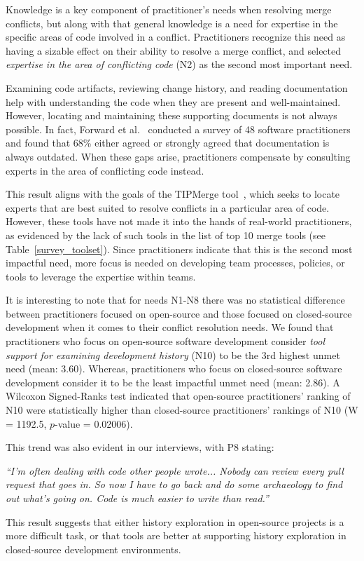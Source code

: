 Knowledge is a key component of practitioner's needs when resolving merge conflicts, but along with that general knowledge is a need for expertise in the specific areas of code involved in a conflict.
Practitioners recognize this need as having a sizable effect on their ability to resolve a merge conflict, and selected \textit{expertise in the area of conflicting code} (N2) as the second most important need.

Examining code artifacts, reviewing change history, and reading documentation help with understanding the code when they are present and well-maintained.
However, locating and maintaining these supporting documents is not always possible.
In fact, Forward et al.~\cite{forward2002documentation} conducted a survey of 48 software practitioners and found that 68\% either agreed or strongly agreed that documentation is always outdated.
When these gaps arise, practitioners compensate by consulting experts in the area of conflicting code instead.

This result aligns with the goals of the TIPMerge tool~\cite{CostaSarma}, which seeks to locate experts that are best suited to resolve conflicts in a particular area of code.
However, these tools have not made it into the hands of real-world practitioners, as evidenced by the lack of such tools in the list of top 10 merge tools (see Table~\ref{survey_toolset}).
Since practitioners indicate that this is the second most impactful need, more focus is needed on developing team processes, policies, or tools to leverage the expertise within teams.

\label{oss_vs_closed_tool_support} 
It is interesting to note that for needs N1-N8 there was no statistical difference between practitioners focused on open-source and those focused on closed-source development when it comes to their conflict resolution needs.
We found that practitioners who focus on open-source software development consider \textit{tool support for examining development history} (N10) to be the 3rd highest unmet need (mean: 3.60).
Whereas, practitioners who focus on closed-source software development consider it to be the least impactful unmet need (mean: 2.86).
A Wilcoxon Signed-Ranks test indicated that open-source practitioners' ranking of N10 were statistically higher than closed-source practitioners' rankings of N10 (W = 1192.5, $p$-value = 0.02006).

This trend was also evident in our interviews, with P8 stating:

\begin{displayquote}
\textit{``I'm often dealing with code other people wrote... Nobody can review every pull request that goes in. So now I have to go back and do some archaeology to find out what's going on. Code is much easier to write than read.''}
\end{displayquote}

This result suggests that either history exploration in open-source projects is a more difficult task, or that tools are better at supporting history exploration in closed-source development environments.

